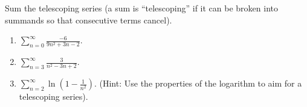 Sum the telescoping series (a sum is ``telescoping'' if it can be broken into summands so that consecutive terms cancel). 
\begin{enumerate}[ref={\fcProblemRef}]
\item $\displaystyle \sum\limits_{n=0}^{\infty} \frac{-6}{9 n^{2}+3 n-2}$\quad.
\item \label{probelmSum_n=3^infty 3/(n^2-3n+2) }  $\displaystyle \sum \limits_{n=3}^{\infty} \frac{3}{n^{2}-3 n+2} $\quad.

\item \label{problemsumn=2^inftyln(1-1/n^2)} $\displaystyle\sum_{n=2}^{\infty} \ln \left(1-\frac{1}{n^2}\right).$ (Hint: Use the properties of the logarithm to aim for a telescoping series).


\end{enumerate}